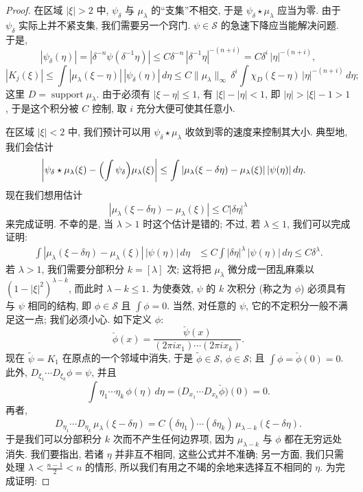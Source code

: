 \begin{proof}
在区域 $|\xi|>2$ 中, $\psi_\delta$ 与 $\mu_\lambda$ 的``支集''不相交, 于是 $\psi_\delta\star\mu_\lambda$ 应当为零. 由于 $\psi_\delta$ 实际上并不紧支集, 我们需要另一个窍门. $\psi\in\mathcal{S}$ 的急速下降应当能解决问题. 于是,
\[
|\psi_{\delta}(\eta)|=|\delta^{-n}\psi(\delta^{-1}\eta)|
\leq C\delta^{-n}\,|\delta^{-1}\eta|^{-(n+i)}
=C\delta^{i}\,|\eta|^{-(n+i)},
\]
\[
|K_{j}(\xi)|\leq\int|\mu_{\lambda}(\xi-\eta)|\,|\psi_{\delta}(\eta)|\,d\eta
\leq C\|\mu_{\lambda}\|_{\infty}\,\delta^{i}\int\chi_{D}(\xi-\eta)\,|\eta|^{-(n+i)}\,d\eta;
\]
这里 $D=\operatorname{support}\mu_\lambda$. 由于必须有 $|\xi-\eta|\leq 1$, 有 $|\xi|-|\eta|<1$, 即 $|\eta|>|\xi|-1>1$, 于是这个积分被 $C$ 控制, 取 $i$ 充分大便可使其任意小.

在区域 $|\xi|<2$ 中, 我们预计可以用 $\psi_\delta\star\mu_\lambda$ 收敛到零的速度来控制其大小. 典型地, 我们会估计
\begin{align*}
\left|\psi_{\delta}\star\mu_{\lambda}(\xi)-\Bigl(\int\psi_{\delta}\Bigr)\mu_{\lambda}(\xi)\right|
&\leq\int|\mu_{\lambda}(\xi-\delta\eta)-\mu_{\lambda}(\xi)|\,|\psi(\eta)|\,d\eta.
\end{align*}
现在我们想用估计
\[
|\mu_{\lambda}(\xi-\delta\eta)-\mu_{\lambda}(\xi)|\leq C|\delta\eta|^{\lambda}
\]
来完成证明. 不幸的是, 当 $\lambda>1$ 时这个估计是错的; 不过, 若 $\lambda\leq 1$, 我们可以完成证明:
\begin{align*}
\int|\mu_{\lambda}(\xi-\delta\eta)-\mu_{\lambda}(\xi)|\,|\psi(\eta)|\,d\eta
&\leq C\int|\delta\eta|^{\lambda}\,|\psi(\eta)|\,d\eta\leq C\delta^{\lambda}.
\end{align*}
若 $\lambda>1$, 我们需要分部积分 $k=[\lambda]$ 次; 这将把 $\mu_\lambda$ 微分成一团乱麻乘以 $(1-|\xi|^2)^{\lambda-k}$, 而此时 $\lambda-k\leq 1$. 为使奏效, $\psi$ 的 $k$ 次积分 (称之为 $\phi$) 必须具有与 $\psi$ 相同的结构, 即 $\phi\in\mathcal{S}$ 且 $\int\phi=0$. 当然, 对任意的 $\psi$, 它的不定积分一般不满足这一点; 我们必须小心. 如下定义 $\phi$:
\[
\check{\phi}(x)=\frac{\check{\psi}(x)}{(2\pi ix_{1})\cdots(2\pi ix_{k})}.
\]
现在 $\tilde{\psi}=K_1$ 在原点的一个邻域中消失, 于是 $\tilde{\phi}\in\mathcal{S}$, $\phi\in\mathcal{S}$; 且 $\int\phi=\check{\phi}(0)=0$. 此外, $D_{\xi_1}\cdots D_{\xi_k}\phi=\psi$, 并且
\[
\int\eta_{1}\cdots\eta_{k}\,\phi(\eta)\,d\eta
=\bigl(D_{x_{1}}\cdots D_{x_{k}}\check{\phi}\bigr)(0)=0.
\]
再者,
\[
D_{\eta_{1}}\cdots D_{\eta_{k}}\,\mu_{\lambda}(\xi-\delta\eta)
=C\,(\delta\eta_{1})\cdots(\delta\eta_{k})\,\mu_{\lambda-k}(\xi-\delta\eta).
\]
于是我们可以分部积分 $k$ 次而不产生任何边界项, 因为 $\mu_{\lambda-k}$ 与 $\phi$ 都在无穷远处消失. 我们要指出, 若诸 $\eta$ 并非互不相同, 这些公式并不准确; 另一方面, 我们只需处理 $\lambda<\frac{n-1}{2}<n$ 的情形, 所以我们有用之不竭的余地来选择互不相同的 $\eta$. 为完成证明:

\end{proof}
